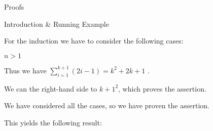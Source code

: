 \begin{sfragment}{Proofs}
\begin{sfragment}{Introduction \& Running Example}
\begin{latexcode}
\begin{sproof}[id=simple-proof]
\begin{spfcases}{For the induction we have to consider the following cases:}
\begin{spfcase}{$n>1$}
      \begin{spfstep}
        Thus we have $\sum_{i=1}^{k+1}{(2i-1)}=k^2+2k+1$
        .
      \end{spfstep}
      \begin{spfstep}[type=conclusion]
        We can  the right-hand side to ${k+1}^2$, which
        proves the assertion.
      \end{spfstep}
   \end{spfcase}
    \begin{spfstep}[type=conclusion]
      We have considered all the cases, so we have proven the assertion.
    \end{spfstep}
  \end{spfcases}
\end{sproof}
\end{latexcode}

This yields the following result: 


\end{sfragment}
\end{sfragment}
